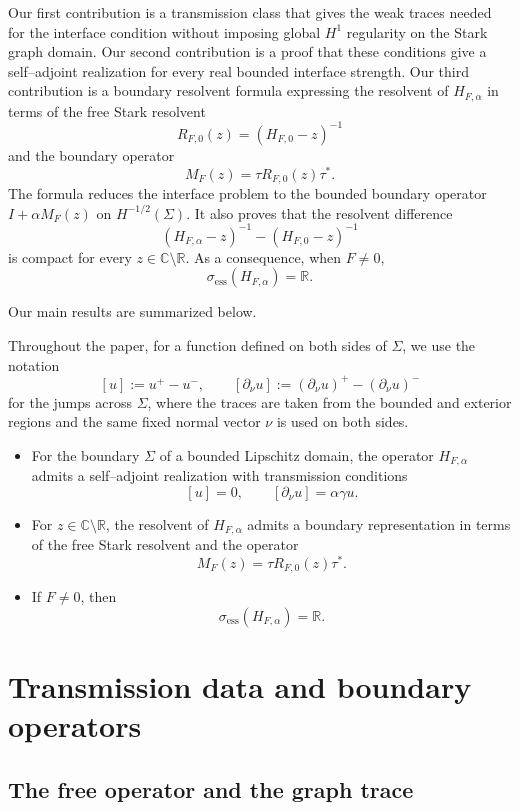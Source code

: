 \documentclass[a4paper,11pt]{article}
\numberwithin{equation}{section}
\theoremstyle{remark}
\theoremstyle{definition}
\theoremstyle{remark}
\begin{document}
Our first contribution is a transmission class that gives the weak traces needed for the interface condition without imposing global $H^1$ regularity on the Stark graph domain.
Our second contribution is a proof that these conditions give a self--adjoint realization for every real bounded interface strength.
Our third contribution is a boundary resolvent formula expressing the resolvent of $H_{F,\alpha}$ in terms of the free Stark resolvent
$$
R_{F,0}(z)=(H_{F,0}-z)^{-1}
$$
and the boundary operator
$$
M_F(z)=\tau R_{F,0}(z)\tau^*.
$$
The formula reduces the interface problem to the bounded boundary operator $I+\alpha M_F(z)$ on $H^{-1/2}(\Sigma)$.
It also proves that the resolvent difference
$$
(H_{F,\alpha}-z)^{-1}-(H_{F,0}-z)^{-1}
$$
is compact for every $z\in\mathbb C\setminus\mathbb R$.
As a consequence, when $F\ne0$,
$$
\sigma_{\mathrm{ess}}(H_{F,\alpha})=\mathbb R.
$$

Our main results are summarized below.

Throughout the paper, for a function defined on both sides of $\Sigma$, we use the notation
$$
[u]:=u^+-u^-,
\qquad
[\partial_\nu u]:=(\partial_\nu u)^+-(\partial_\nu u)^-
$$
for the jumps across $\Sigma$, where the traces are taken from the bounded and exterior regions and the same fixed normal vector $\nu$ is used on both sides.

\begin{itemize}
\item[(i)] For the boundary $\Sigma$ of a bounded Lipschitz domain, the operator $H_{F,\alpha}$ admits a self--adjoint realization with transmission conditions
$$
[u]=0,
\qquad
[\partial_\nu u]=\alpha\gamma u.
$$

\item[(ii)] For $z\in\mathbb C\setminus\mathbb R$, the resolvent of $H_{F,\alpha}$ admits a boundary representation in terms of the free Stark resolvent and the operator
$$
M_F(z)=\tau R_{F,0}(z)\tau^*.
$$

\item[(iii)] If $F\ne0$, then
$$
\sigma_{\mathrm{ess}}(H_{F,\alpha})=\mathbb R.
$$
\end{itemize}
\section{Transmission data and boundary operators}\label{sec:boundary}

\subsection{The free operator and the graph trace}
\end{document}
